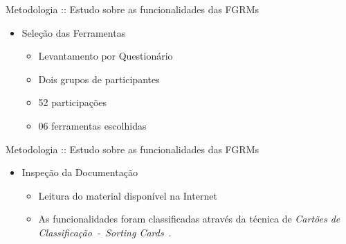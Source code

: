 \documentclass[t,14pt,mathserif]{beamer}
\begin{document}
\begin{frame}{Metodologia :: Estudo sobre as funcionalidades das FGRMs}
    \begin{itemize}
        \item Seleção das Ferramentas
            \begin{itemize}
                \item Levantamento por Questionário
                \item Dois grupos de participantes
                \item 52 participações
                \item 06 ferramentas escolhidas
            \end{itemize}
    \end{itemize}
\end{frame}

\begin{frame}{Metodologia :: Estudo sobre as funcionalidades das FGRMs}
    \begin{itemize}
        \item Inspeção da Documentação
            \begin{itemize}
                \item Leitura do material disponível na Internet
                \item As funcionalidades foram classificadas através da técnica
                    de \textit{Cartões de Classificação~-~Sorting
                        Cards}~\cite{just2008towards}.
            \end{itemize}
    \end{itemize}
\end{frame}


\end{document}
